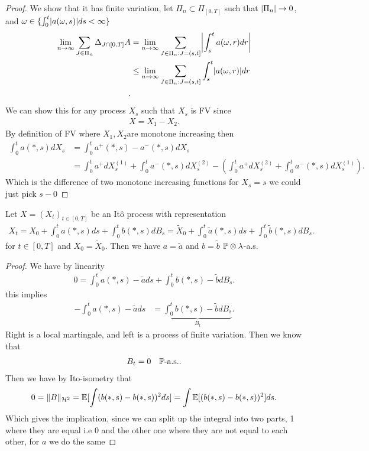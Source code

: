 \begin{proof}
  We show that it has finite variation, let $\Pi_n \subset  \Pi_{[0,T]}$  such that $\abs{\Pi_n} \to 0$,
  and $\omega  \in  \{\int_0^{t} \abs{a(\omega ,s)} ds  <\infty\}$
  \begin{align*}
    \lim_{n\to \infty} \sum_{J \in  \Pi_n} \Delta_{J \cap [0,T]} A &=  \lim_{n\to \infty} \sum_{J \in  \Pi_n : J = (s,t]} \abs*{\int_{s}^{t} a(\omega ,r) dr }\\
                                                                   &\le  \lim_{n\to \infty} \sum_{J \in  \Pi_n : J = (s,t]} \int_{s}^{t} \abs{a(\omega ,r)} dr \\
  .\end{align*}
  We can show this for any process $X_s$ such that $X_s$ is FV since 
  \begin{align*}
    X = X_{1}-X_{2}
  .\end{align*}
  By definition of FV where  $X_{1},X_{2}$are monotone increasing then 
  \begin{align*}
    \int_0^{t} a(*,s) dX_s &= \int_0^{t} a^{+}(*,s) - a^{-}(*,s)   dX_s \\
                           &= \int_0^{t} a^{+} dX^{(1)}_s + \int_{0}^{t}  a^{-}(*,s) dX^{(2)}_s - (\int_0^{t} a^{+} dX^{(2)}_s + \int_{0}^{t}  a^{-}(*,s) dX^{(1)}_s)
  .\end{align*}
  Which is the difference of two monotone increasing functions for $X_s = s$ we could just pick $s-0$
\end{proof}
\begin{Lemma}[4.2]
  Let $X  = (X_t)_{t \in  [0,T]}$  be an It\^o process with representation
  \begin{align*}
    X_t = X_{0} + \int_0^{t} a(*,s) ds + \int_0^{t} b(*,s) dB_s = \tilde{X}_0 +\int_0^{t} \tilde{a}(*,s) ds + \int_0^{t} \tilde{b}(*,s) dB_s
  .\end{align*}
  for $t \in  [0,T]$ and $X_{0} = \tilde{X}_0 $. Then we have $a = \tilde{a}  $ and $b = \tilde{b} $ $\P \otimes \lambda $-a.s.
\end{Lemma}
\begin{proof}
 We have by linearity 
 \begin{align*}
  0 =  \int_0^{t} a(*,s)-\tilde{a}  ds + \int_0^{t} b(*,s)-\tilde{b}  dB_s
 .\end{align*}
 this implies 
 \begin{align*}
   -\int_0^{t} a(*,s)-\tilde{a}  ds &=\underbrace{\int_0^{t} b(*,s)-\tilde{b}  dB_s}_{B_t}
 .\end{align*}
 Right is a local martingale, and left is a process of finite variation. Then we know that 
\begin{align*}
  B_t = 0 \quad \P\text{-a.s.}
.\end{align*}
Then we have  by Ito-isometry that 
\begin{align*}
  0 = \|B\|_{\mathcal{H}^2} = \E[\int (b(*,s)-b(*,s))^2 ds ] = \int \E[(b(*,s)-b(*,s))^2] ds 
.\end{align*}
Which gives the implication, since we can split up the integral into two parts, 1 where they are equal i.e 0 and the other one where
they are not equal to each other, for $a$ we do the same
\end{proof}
